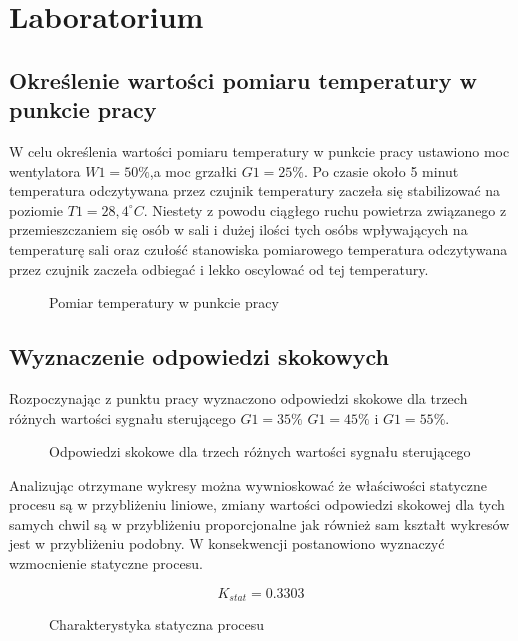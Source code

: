 \chapter{Laboratorium}

\section{Określenie wartości pomiaru temperatury w punkcie pracy}

W celu określenia wartości pomiaru temperatury w punkcie pracy ustawiono moc wentylatora  $W1 = 50\%$,a moc grzałki $G1 = 25\%$.
Po czasie około 5 minut temperatura odczytywana przez czujnik temperatury zaczeła się stabilizować  na poziomie  $T1 = 28,4^{\circ} C$. 
Niestety z powodu ciągłego ruchu powietrza związanego z przemieszczaniem się osób w sali i dużej ilości tych osóbs wpływających na temperaturę sali oraz czułość stanowiska pomiarowego temperatura odczytywana przez czujnik zaczeła odbiegać i lekko oscylować od tej temperatury.

\begin{figure}[H]
\centering

\caption{Pomiar temperatury w punkcie pracy}
\end{figure}

\section{Wyznaczenie odpowiedzi skokowych}

Rozpoczynając z punktu pracy wyznaczono odpowiedzi skokowe dla trzech różnych wartości sygnału sterującego  $G1 = 35\%$  $G1 = 45\%$ i $G1 = 55\%$.

\begin{figure}[H]
\centering

\caption{Odpowiedzi skokowe dla trzech różnych wartości sygnału sterującego}
\end{figure}

Analizując otrzymane wykresy można wywnioskować że właściwości statyczne procesu są w przybliżeniu liniowe, zmiany wartości odpowiedzi skokowej dla tych samych chwil są w przybliżeniu proporcjonalne jak również sam kształt wykresów jest w przybliżeniu podobny. W konsekwencji postanowiono wyznaczyć wzmocnienie statyczne procesu.

\begin{equation}
K_{stat} = 0.3303
\end{equation}


\begin{figure}[H]
\centering

\caption{Charakterystyka statyczna procesu}
\end{figure}

